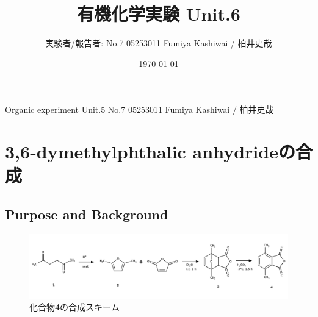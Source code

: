 \documentclass{ltjsarticle}
\title{有機化学実験 Unit.6}
\date{\today}
\author{実験者/報告者: No.7 05253011 Fumiya Kashiwai / 柏井史哉}
\theoremstyle{definition}
\numberwithin{equation}{section}
\begin{document}
\maketitle
{} {Organic experiment Unit.5 No.7 05253011 Fumiya Kashiwai / 柏井史哉}

\newpage
\section{3,6-dymethylphthalic anhydrideの合成}
\subsection{Purpose and Background}
\begin{figure}[htbp]
\begin{center}
\includegraphics[width = 15 cm]{scheme6-1.png}
\caption{化合物\textbf{4}の合成スキーム}
\label{scheme_6-1}
\end{center}
\end{figure}
\end{document}
